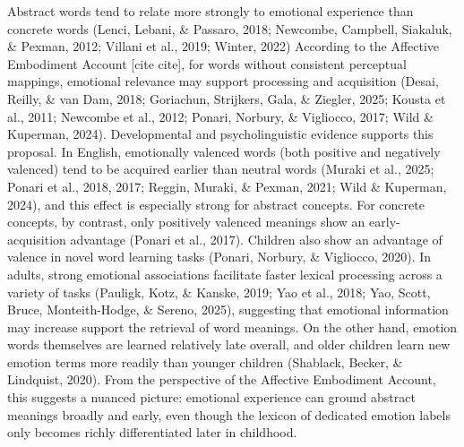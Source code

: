 \documentclass[
  man,floatsintext]{apa6}
\begin{document}
Abstract words tend to relate more strongly to emotional experience than concrete words (Lenci, Lebani, \& Passaro, 2018; Newcombe, Campbell, Siakaluk, \& Pexman, 2012; Villani et al., 2019; Winter, 2022) According to the Affective Embodiment Account {[}cite cite{]}, for words without consistent perceptual mappings, emotional relevance may support processing and acquisition (Desai, Reilly, \& van Dam, 2018; Goriachun, Strijkers, Gala, \& Ziegler, 2025; Kousta et al., 2011; Newcombe et al., 2012; Ponari, Norbury, \& Vigliocco, 2017; Wild \& Kuperman, 2024). Developmental and psycholinguistic evidence supports this proposal. In English, emotionally valenced words (both positive and negatively valenced) tend to be acquired earlier than neutral words (Muraki et al., 2025; Ponari et al., 2018, 2017; Reggin, Muraki, \& Pexman, 2021; Wild \& Kuperman, 2024), and this effect is especially strong for abstract concepts. For concrete concepts, by contrast, only positively valenced meanings show an early-acquisition advantage (Ponari et al., 2017). Children also show an advantage of valence in novel word learning tasks (Ponari, Norbury, \& Vigliocco, 2020). In adults, strong emotional associations facilitate faster lexical processing across a variety of tasks (Pauligk, Kotz, \& Kanske, 2019; Yao et al., 2018; Yao, Scott, Bruce, Monteith-Hodge, \& Sereno, 2025), suggesting that emotional information may increase support the retrieval of word meanings. On the other hand, emotion words themselves are learned relatively late overall, and older children learn new emotion terms more readily than younger children (Shablack, Becker, \& Lindquist, 2020). From the perspective of the Affective Embodiment Account, this suggests a nuanced picture: emotional experience can ground abstract meanings broadly and early, even though the lexicon of dedicated emotion labels only becomes richly differentiated later in childhood.
\end{document}
